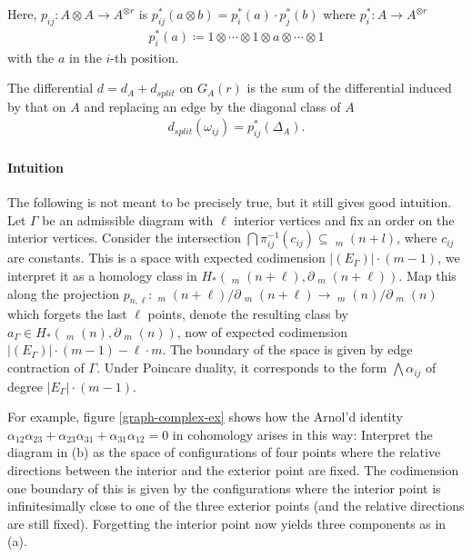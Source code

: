 \documentclass{scrartcl}
\theoremstyle{plain}
\theoremstyle{definition}
\newcommand{\abs}[1]{\left\lvert#1\right\rvert}
\renewcommand{\subset}{\subseteq}
\newcommand{\defeq}{\coloneqq}
\DeclareMathOperator{\cConf}{\overline{Conf}}
\begin{document}
Here, $p_{ij} \colon A\otimes A \to A^{\otimes r}$ is $p_{ij}^*(a\otimes b) = p_i^*(a)\cdot p_j^*(b)$ where $p_i^*\colon A\to A^{\otimes r}$
\begin{align*}
    p_i^*(a) \defeq 1\otimes \cdots \otimes 1\otimes a\otimes\cdots\otimes 1
\end{align*}
with the $a$ in the $i$-th position. 

The differential $d = d_A + d_{split}$ on $G_A(r)$ is the sum of the differential induced by that on $A$ and replacing an edge by the diagonal class of $A$
\begin{align*}
    d_{split}(\omega_{ij}) = p_{ij}^*(\Delta_A).
\end{align*}



\paragraph{Intuition} The following is not meant to be precisely true, but it still gives good intuition. Let $\Gamma$ be an admissible diagram with $\ell$ interior vertices and fix an order on the interior vertices. Consider the intersection $\bigcap \pi_{ij}^{-1}(c_{ij})\subset \cConf_m(n+l)$, where $c_{ij}$ are constants. This is a space with expected codimension $\abs{(E_\Gamma)}\cdot (m-1)$, we interpret it as a homology class in $H_*(\cConf_m(n+\ell), \partial\cConf_m(n+\ell))$. Map this along the projection $p_{n,\ell}\colon \cConf_m(n+\ell)/\partial\cConf_m(n+\ell) \to \cConf_m(n)/\partial\cConf_m(n)$ which forgets the last $\ell$ points, denote the resulting class by $a_\Gamma\in H_*(\cConf_m(n), \partial\cConf_m(n))$, now of expected codimension $\abs{(E_\Gamma)}\cdot (m-1) - \ell\cdot m$. The boundary of the space is given by edge contraction of $\Gamma$. Under Poincare duality, it corresponds to the form $\bigwedge \alpha_{ij}$ of degree $\abs{E_\Gamma}\cdot (m-1)$. 

For example, figure \ref{graph-complex-ex} shows how the Arnol'd identity $\alpha_{12}\alpha_{23} + \alpha_{23}\alpha_{31} + \alpha_{31}\alpha_{12} = 0$ in cohomology arises in this way: Interpret the diagram in (b) as the space of configurations of four points where the relative directions between the interior and the exterior point are fixed. The codimension one boundary of this is given by the configurations where the interior point is infinitesimally close to one of the three exterior points (and the relative directions are still fixed). Forgetting the interior point now yields three components as in (a).  
\end{document}
